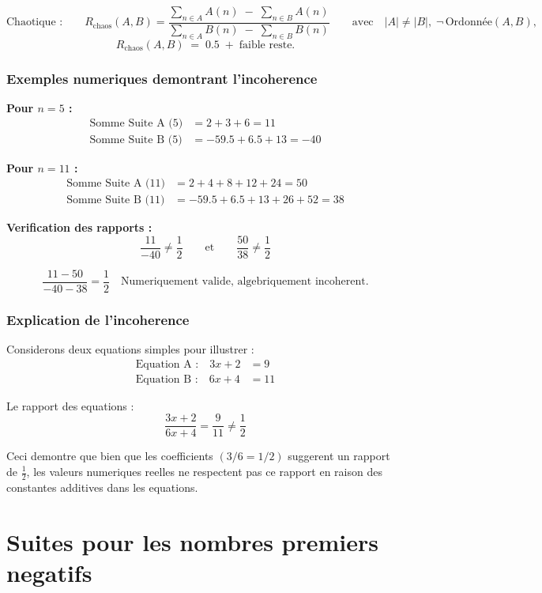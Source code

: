 \documentclass[a4paper,11pt]{article}
\begin{document}
\[
\text{Chaotique :}\qquad
R_{\mathrm{chaos}}(A,B)
=
\frac{\displaystyle \sum_{n \in A} A(n)\;-\;\sum_{n \in B} A(n)}
     {\displaystyle \sum_{n \in A} B(n)\;-\;\sum_{n \in B} B(n)}
\qquad\text{avec}\quad |A| \neq |B|,\; \neg\,\text{Ordonnée}(A,B),
\]
\[
R_{\mathrm{chaos}}(A,B) \;=\; 0.5 \;+\; \text{faible reste}.
\]

\subsubsection{Exemples numeriques demontrant l'incoherence}

\textbf{Pour $n = 5$ :}
\begin{align}
\text{Somme Suite A (5)} &= 2 + 3 + 6 = 11 \\
\text{Somme Suite B (5)} &= -59.5 + 6.5 + 13 = -40
\end{align}

\textbf{Pour $n = 11$ :}
\begin{align}
\text{Somme Suite A (11)} &= 2 + 4 + 8 + 12 + 24 = 50 \\
\text{Somme Suite B (11)} &= -59.5 + 6.5 + 13 + 26 + 52 = 38
\end{align}

\textbf{Verification des rapports :}
\[
\frac{11}{-40} \neq \frac{1}{2}
\qquad\text{et}\qquad
\frac{50}{38} \neq \frac{1}{2}
\]

\[
\frac{11 - 50}{-40 - 38} = \frac{1}{2}
\quad\text{Numeriquement valide, algebriquement incoherent.}
\]

\subsubsection{Explication de l'incoherence}

Considerons deux equations simples pour illustrer :
\begin{align}
\text{Equation A :} \quad 3x + 2 &= 9 \\
\text{Equation B :} \quad 6x + 4 &= 11
\end{align}

Le rapport des equations :
\[
\frac{3x + 2}{6x + 4} = \frac{9}{11} \neq \frac{1}{2}
\]

Ceci demontre que bien que les coefficients $(3/6 = 1/2)$ suggerent un rapport de $\frac{1}{2}$, les valeurs numeriques reelles ne respectent pas ce rapport en raison des constantes additives dans les equations.

\section*{Suites pour les nombres premiers negatifs}
\end{document}
